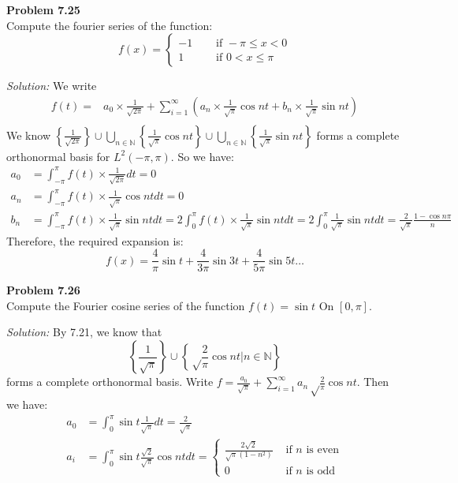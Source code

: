 \documentclass[a4paper, 11pt]{article}
\newenvironment{problem}[2][Problem]
    { \begin{mdframed}[backgroundcolor=gray!20] \textbf{#1 #2} \\}
    {  \end{mdframed}}
\newenvironment{solution}
    {\textit{Solution:}}
    {}
\begin{document}
\begin{problem}{7.25}
    Compute the fourier series of the function:
    $$f(x)=\begin{cases}
        -1&\quad\text{ if }-\pi\leq x< 0\\
        1&\quad\text{ if }0<x\leq  \pi
    \end{cases}$$
\end{problem}
\begin{solution}
    We write 
    \begin{align*}
        f(t)=&{a_0}\times\frac{1}{\sqrt{2\pi}}+\sum_{i=1}^\infty\left(a_n\times\frac{1}{\sqrt{\pi}}\cos nt+b_n\times\frac{1}{\sqrt{\pi}}\sin nt\right)\\
    \end{align*}
    We know $\left\{\frac{1}{\sqrt{2\pi}}\right\}\cup\bigcup_{n\in\mathbb N}\left\{\frac{1}{\sqrt\pi}\cos nt\right\}\cup\bigcup_{n\in\mathbb N}\left\{\frac{1}{\sqrt\pi}\sin nt\right\}$ forms a complete orthonormal basis for $L^2(-\pi,\pi)$. So we have:
    \begin{align*}
        a_0&=\int_{-\pi}^\pi f(t)\times\frac{1}{\sqrt{2\pi}}dt=0\\
        a_n&=\int_{-\pi}^\pi f(t)\times\frac{1}{\sqrt{\pi}}\cos ntdt=0\\
        b_n&=\int_{-\pi}^\pi f(t)\times\frac{1}{\sqrt{\pi}}\sin ntdt=2\int_{0}^\pi f(t)\times\frac{1}{\sqrt{\pi}}\sin ntdt=2\int_{0}^\pi\frac{1}{\sqrt{\pi}}\sin ntdt=\frac{2}{\sqrt\pi}\frac{1-\cos n\pi}{n}
    \end{align*}
    Therefore, the required expansion is:
    $$f(x)=\frac{4}{\pi}\sin t+\frac{4}{3\pi}\sin 3t+\frac{4}{5\pi}\sin 5t\hdots$$
\end{solution}

\begin{problem}{7.26}
    Compute the Fourier cosine series of the function $f(t) = \sin t$ On
$[0, \pi]$.
\end{problem}
\begin{solution}
    By 7.21, we know that
    $$\left\{\frac{1}{\sqrt{\pi}}\right\}\cup \left\{\sqrt\frac{2}{{\pi}}\cos nt|n\in\mathbb N\right\}$$    
    forms a complete orthonormal basis. 
    Write $f=\frac{a_0}{\sqrt{\pi}}+\sum_{i=1}^\infty a_n\sqrt\frac{2}{{\pi}}\cos nt$. Then we have:
    \begin{align*}
        a_0&=\int_{0}^\pi \sin t\frac{1}{\sqrt{\pi}}dt=\frac{2}{\sqrt\pi}\\
        a_i&=\int_{0}^\pi \sin t\frac{\sqrt{2}}{\sqrt{\pi}}\cos ntdt=\begin{cases}
            \frac{2\sqrt 2}{\sqrt\pi (1-n^2)}&\text{ if }n\text{ is even}\\
            0&\text{ if }n\text{ is odd}
        \end{cases}
    \end{align*}
\end{solution}
\end{document}
